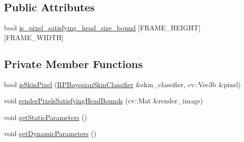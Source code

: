 \subsection*{\-Public \-Attributes}
\begin{DoxyCompactItemize}
\item 
bool \hyperlink{class_r_p_depth_head_detector_a784cfd1c3b1593ba40005c1e9b084481}{is\-\_\-pixel\-\_\-satisfying\-\_\-head\-\_\-size\-\_\-bound} \mbox{[}\-F\-R\-A\-M\-E\-\_\-\-H\-E\-I\-G\-H\-T\mbox{]}\mbox{[}\-F\-R\-A\-M\-E\-\_\-\-W\-I\-D\-T\-H\mbox{]}
\end{DoxyCompactItemize}
\subsection*{\-Private \-Member \-Functions}
\begin{DoxyCompactItemize}
\item 
bool \hyperlink{class_r_p_depth_head_detector_a5da9a2b247dd2b1abf5d9aade1db7e7a}{is\-Skin\-Pixel} (\hyperlink{class_r_p_bayesian_skin_classifier}{\-R\-P\-Bayesian\-Skin\-Classifier} \&skin\-\_\-classifier, cv\-::\-Vec3b \&pixel)
\item 
void \hyperlink{class_r_p_depth_head_detector_a81457e68bdb5dec9649e7c396feb1807}{render\-Pixels\-Satisfying\-Head\-Bounds} (cv\-::\-Mat \&render\-\_\-image)
\item 
void \hyperlink{class_r_p_depth_head_detector_aae8aa7f4630ec38ef8a5eb43fb266dca}{get\-Static\-Parameters} ()
\item 
void \hyperlink{class_r_p_depth_head_detector_a550c1f761bf0c9d5136c63fa859f8ab0}{get\-Dynamic\-Parameters} ()
\end{DoxyCompactItemize}
